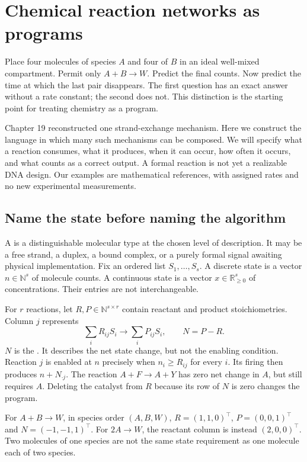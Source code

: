 \chapter{Chemical reaction networks as programs}

Place four molecules of species $A$ and four of $B$ in an ideal well-mixed
compartment. Permit only $A+B\rightarrow W$. Predict the final counts.
Now predict the time at which the last pair disappears. The first question
has an exact answer without a rate constant; the second does not.
This distinction is the starting point for treating chemistry as a program.

Chapter 19 reconstructed one strand-exchange mechanism. Here we construct
the language in which many such mechanisms can be composed. We will specify
what a reaction consumes, what it produces, when it can occur, how often it
occurs, and what counts as a correct output. A formal reaction is not yet
a realizable DNA design. Our examples are mathematical references, with
assigned rates and no new experimental measurements.

\section{Name the state before naming the algorithm}

A  is a distinguishable molecular type at the chosen level of
description. It may be a free strand, a duplex, a bound complex, or a purely
formal signal awaiting physical implementation. Fix an ordered list
$S_1,\ldots,S_s$. A discrete state is a vector
$n\in\mathbb N^s$ of molecule counts. A continuous state is a vector
$x\in\mathbb R_{\geq0}^s$ of concentrations. Their entries are not interchangeable.

For $r$ reactions, let $R,P\in\mathbb N^{s\times r}$ contain reactant and product
stoichiometries. Column $j$ represents
\begin{equation}
 \sum_i R_{ij}S_i\longrightarrow\sum_i P_{ij}S_i,\qquad
 N=P-R .
 \label{eq:stoich}
\end{equation}
$N$ is the . It describes the net state change,
but not the enabling condition. Reaction $j$ is enabled at $n$ precisely when
$n_i\geq R_{ij}$ for every $i$. Its firing then produces $n+N_{\cdot j}$.
The reaction $A+F\rightarrow A+Y$ has zero net change in $A$, but still
requires $A$. Deleting the catalyst from $R$ because its row of $N$ is zero
changes the program.

For $A+B\rightarrow W$, in species order $(A,B,W)$,
$R=(1,1,0)^\top$, $P=(0,0,1)^\top$ and $N=(-1,-1,1)^\top$.
For $2A\rightarrow W$, the reactant column is instead $(2,0,0)^\top$.
Two molecules of one species are not the same state requirement as one
molecule each of two species.

